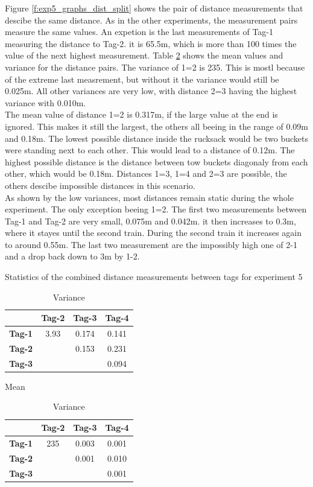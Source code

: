 Figure \ref{f:exp5_graphs_dist_split} shows the pair of distance measurements that descibe the same distance.
As in the other experiments, the measurement pairs measure the same values.
An expetion is the last measurements of Tag-1 measuring the distance to Tag-2. it is 65.5m, which is more than 100 times the value of the next highest measurement.
Table \ref{tab:exp5_var_distanc} shows the mean values and variance for the distance pairs.
The variance of 1=2 is 235.
This is mostl because of the extreme last measrement, but without it the variance would still be 0.025m.
All other variances are very low, with distance 2=3 having the highest variance with 0.010m.\\
The mean value of distance 1=2 is 0.317m, if the large value at the end is ignored. This makes it still the largest, the others all beeing in the range of 0.09m and 0.18m.
The lowest possible distance inside the rucksack would be two buckets were standing next to each other. This would lead to a distance of 0.12m.
The highest possible distance is the distance between tow buckets diagonaly from each other, which would be 0.18m.
Distances 1=3, 1=4 and 2=3 are possible, the others descibe impossible distances in this scenario.\\
As shown by the low variances, most distances remain static during the whole experiment. The only exception beeing 1=2.
The first two measurements between Tag-1 and Tag-2 are very small, 0.075m and 0.042m. it then increases to 0.3m, where it stayes until the second train.
During the second train it increases again to around 0.55m.
The last two measurement are the impossibly high one of 2-1 and a drop back down to 3m by 1-2.


\begin{table}[ht]
\centering
\caption{Statistics of the combined distance measurements between tags for experiment 5}
\begin{minipage}{0.45\textwidth}
\centering
\begin{tabular}{|c|c c c|}
\hline
		& \textbf{Tag-2} & \textbf{Tag-3} & \textbf{Tag-4} \\
\hline
\textbf{Tag-1}   & 3.93 & 0.174 & 0.141 \\
\textbf{Tag-2}   &  & 0.153 & 0.231 \\
\textbf{Tag-3}   &  &  & 0.094 \\
\hline
\end{tabular}
\caption*{Mean}
\end{minipage}
\hfill
\begin{minipage}{0.45\textwidth}
\centering
\begin{tabular}{|c|c c c|}
\hline
		& \textbf{Tag-2} & \textbf{Tag-3} & \textbf{Tag-4} \\
\hline
\textbf{Tag-1}   & 235 & 0.003 & 0.001 \\
\textbf{Tag-2}   &  & 0.001 & 0.010 \\
\textbf{Tag-3}   &  &  & 0.001 \\
\hline
\end{tabular}
\caption*{Variance}
\end{minipage}
\label{tab:exp5_var_distanc}
\end{table}

